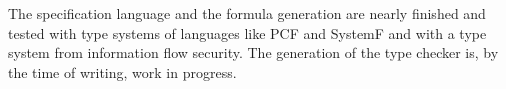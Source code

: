 \documentclass[preprint]{sigplanconf}
\begin{document}
The specification language and the formula generation are nearly
finished and tested with type systems of languages like PCF and
SystemF and with a type system from information flow security. The
generation of the type checker is, by the time of writing, work in
progress.
{} 
\end{document}
